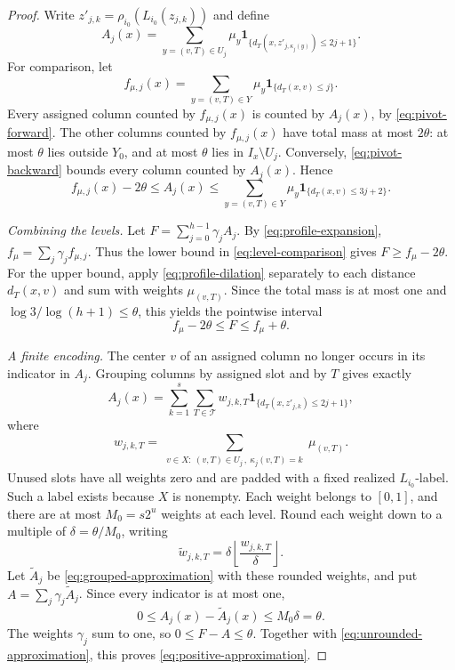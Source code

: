 \begin{proof}
Write $z'_{j,k}=\rho_{i_0}(L_{i_0}(z_{j,k}))$ and define
\[
  A_j(x)=\sum_{y=(v,T)\in U_j}\mu_y
       \mathbf1_{\{d_T(x,z'_{j,\kappa_j(y)})\le2j+1\}}.
\]
For comparison, let
\[
  f_{\mu,j}(x)=\sum_{y=(v,T)\in Y}\mu_y
                       \mathbf1_{\{d_T(x,v)\le j\}}.
\]
Every assigned column counted by $f_{\mu,j}(x)$ is counted by $A_j(x)$,
by \eqref{eq:pivot-forward}.  The other columns counted by
$f_{\mu,j}(x)$ have total mass at most $2\theta$: at most $\theta$ lies
outside $Y_0$, and at most $\theta$ lies in $I_x\setminus U_j$.
Conversely, \eqref{eq:pivot-backward} bounds every column counted by
$A_j(x)$.  Hence
\begin{equation}
  f_{\mu,j}(x)-2\theta
  \le A_j(x)
  \le\sum_{y=(v,T)\in Y}\mu_y\mathbf1_{\{d_T(x,v)\le3j+2\}}.
  \label{eq:level-comparison}
\end{equation}

\emph{Combining the levels.}
Let $F=\sum_{j=0}^{h-1}\gamma_jA_j$.  By
\eqref{eq:profile-expansion}, $f_\mu=\sum_j\gamma_jf_{\mu,j}$.
Thus the lower bound in \eqref{eq:level-comparison} gives
$F\ge f_\mu-2\theta$.  For the upper bound, apply
\eqref{eq:profile-dilation} separately to each distance $d_T(x,v)$ and
sum with weights $\mu_{(v,T)}$.  Since the total mass is at most one and
$\log3/\log(h+1)\le\theta$, this yields the pointwise interval
\begin{equation}
  f_\mu-2\theta\le F\le f_\mu+\theta.
  \label{eq:unrounded-approximation}
\end{equation}

\emph{A finite encoding.}
The center $v$ of an assigned column no longer occurs in its indicator in
$A_j$.  Grouping columns by assigned slot and by $T$ gives exactly
\begin{equation}
  A_j(x)=\sum_{k=1}^{s}\sum_{T\in\mathcal T}
       w_{j,k,T}\mathbf1_{\{d_T(x,z'_{j,k})\le2j+1\}},
  \label{eq:grouped-approximation}
\end{equation}
where
\[
  w_{j,k,T}=
  \sum_{\substack{v\in X:\ (v,T)\in U_j\,,\ \kappa_j(v,T)=k}}
           \mu_{(v,T)}.
\]
Unused slots have all weights zero and are padded with a fixed realized
$L_{i_0}$-label.  Such a label exists because $X$ is nonempty.  Each
weight belongs to $[0,1]$, and there are at most
$M_0=s2^u$ weights at each level.  Round each weight down to a multiple
of $\delta=\theta/M_0$, writing
\[
  \widetilde w_{j,k,T}
   =\delta\left\lfloor\frac{w_{j,k,T}}{\delta}\right\rfloor.
\]
Let $\widetilde A_j$ be \eqref{eq:grouped-approximation} with these
rounded weights, and put $A=\sum_j\gamma_j\widetilde A_j$.  Since every
indicator is at most one,
\[
  0\le A_j(x)-\widetilde A_j(x)\le M_0\delta=\theta.
\]
The weights $\gamma_j$ sum to one, so $0\le F-A\le\theta$.
Together with \eqref{eq:unrounded-approximation}, this proves
\eqref{eq:positive-approximation}.


\end{proof}
